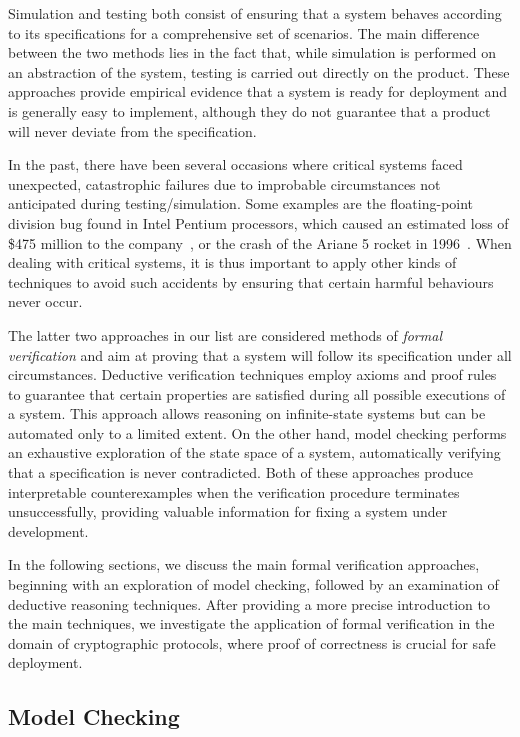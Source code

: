 Simulation and testing both consist of ensuring that a system behaves according to its specifications for a comprehensive set of scenarios. The main difference between the two methods lies in the fact that, while simulation is performed on an abstraction of the system, testing is carried out directly on the product. These approaches provide empirical evidence that a system is ready for deployment and is generally easy to implement, although they do not guarantee that a product will never deviate from the specification.

In the past, there have been several occasions where critical systems faced unexpected, catastrophic failures due to improbable circumstances not anticipated during testing/simulation. Some examples are the floating-point division bug found in Intel Pentium processors, which caused an estimated loss of \$475 million to the company~\cite{pentiumbug}, or the crash of the Ariane 5 rocket in 1996~\cite{ariane5}. When dealing with critical systems, it is thus important to apply other kinds of techniques to avoid such accidents by ensuring that certain harmful behaviours never occur.

The latter two approaches in our list are considered methods of \textit{formal verification} and aim at proving that a system will follow its specification under all circumstances. Deductive verification techniques employ axioms and proof rules to guarantee that certain properties are satisfied during all possible executions of a system. This approach allows reasoning on infinite-state systems but can be automated only to a limited extent. On the other hand, model checking performs an exhaustive exploration of the state space of a system, automatically verifying that a specification is never contradicted. Both of these approaches produce interpretable counterexamples when the verification procedure terminates unsuccessfully, providing valuable information for fixing a system under development.

In the following sections, we discuss the main formal verification approaches, beginning with an exploration of model checking, followed by an examination of deductive reasoning techniques. After providing a more precise introduction to the main techniques, we investigate the application of formal verification in the domain of cryptographic protocols, where proof of correctness is crucial for safe deployment.

\subsection{Model Checking}

